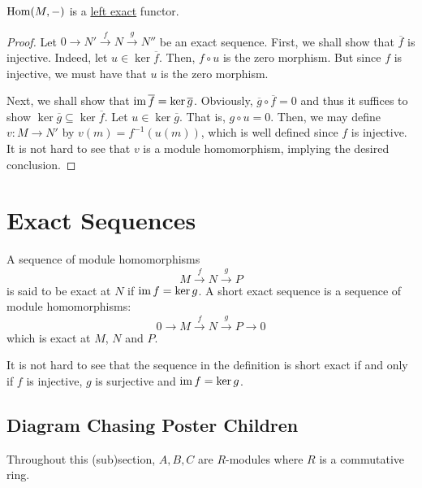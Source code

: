 \begin{theorem}
    $\operatorname{Hom}(M,-)$ is a \underline{left exact} functor.
\end{theorem}
\begin{proof}
    Let $0\rightarrow N'\stackrel f\rightarrow N\stackrel g\rightarrow N''$ be an exact sequence. First, we shall show that $\overline f$ is injective. Indeed, let $u\in\ker\overline f$. Then, $f\circ u$ is the zero morphism. But since $f$ is injective, we must have that $u$ is the zero morphism.

    Next, we shall show that $\operatorname{im}\overline f = \ker\overline g$. Obviously, $\overline g\circ\overline f = 0$ and thus it suffices to show $\ker\overline g\subseteq\ker\overline f$. Let $u\in\ker\overline g$. That is, $g\circ u = 0$. Then, we may define $v: M\to N'$ by $v(m) = f^{-1}(u(m))$, which is well defined since $f$ is injective. It is not hard to see that $v$ is a module homomorphism, implying the desired conclusion.
\end{proof}

\section{Exact Sequences}

\begin{definition}
    A sequence of module homomorphisms 
    \begin{equation*}
        M\stackrel{f}{\longrightarrow} N\stackrel{g}{\longrightarrow}P
    \end{equation*}
    is said to be exact at $N$ if $\operatorname{im} f = \ker g$. A short exact sequence is a sequence of module homomorphisms: 
    \begin{equation*}
        0\longrightarrow M\stackrel{f}{\longrightarrow} N\stackrel{g}{\longrightarrow} P\longrightarrow 0
    \end{equation*}
    which is exact at $M$, $N$ and $P$.
\end{definition}

It is not hard to see that the sequence in the definition is short exact if and only if $f$ is injective, $g$ is surjective and $\operatorname{im} f = \ker g$.

\subsection{Diagram Chasing Poster Children}
Throughout this (sub)section, $A,B,C$ are $R$-modules where $R$ is a commutative ring.

